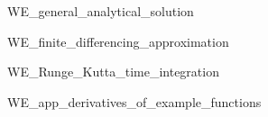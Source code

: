 \documentclass[a4paper,headsepline,12pt,oneside]{scrartcl}
\begin{document}


\newpage
\setcounter{page}{0}
\tableofcontents
\clearpage
\setcounter{page}{1}

{WE_general_analytical_solution}

\clearpage

{WE_finite_differencing_approximation}


\clearpage

\clearpage
{WE_Runge_Kutta_time_integration}

\clearpage
\clearpage
\appendix
{WE_app_derivatives_of_example_functions}
\end{document}
